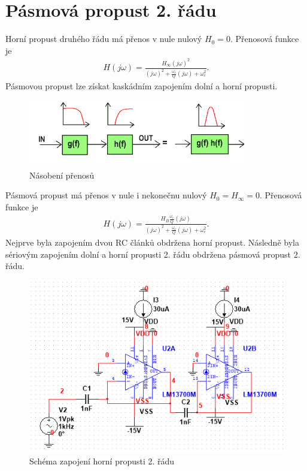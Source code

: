 \documentclass[twoside]{article}
\begin{document}
\section{Pásmová propust 2. řádu}
Horní propust druhého řádu má přenos v nule nulový $H_{0} = 0$. Přenosová funkce je
\begin{align}
H(j\omega) = \frac{H_{\infty} (j\omega) ^2}{(j\omega)^2 + \frac{\omega _c}{Q}(j\omega) + \omega _c ^2}.
\end{align}
\noindent Pásmovou propust lze získat kaskádním zapojením dolní a horní propusti.
\begin{figure}[H]
\centering
\includegraphics[scale=0.9]{fig9.png}
\caption{Násobení přenosů \cite{10}}
\end{figure}
\noindent Pásmová propust má přenos v nule i nekonečnu nulový $H_{0} = H_{\infty} = 0$. Přenosová funkce je
\begin{align}
H(j\omega) = \frac{H_{B} \frac{\omega _c}{Q} (j\omega) }{(j\omega)^2 + \frac{\omega _c}{Q}(j\omega) + \omega _c ^2}.
\end{align}
\noindent Nejprve byla zapojením dvou RC článků obdržena horní propust. Následně byla sériovým zapojením dolní a horní propusti 2. řádu obdržena pásmová propust 2. řádu.
\begin{figure}[H]
\centering
\includegraphics[scale=0.6]{1606.png}
\caption{Schéma zapojení horní propusti 2. řádu}
\end{figure}
\end{document}
